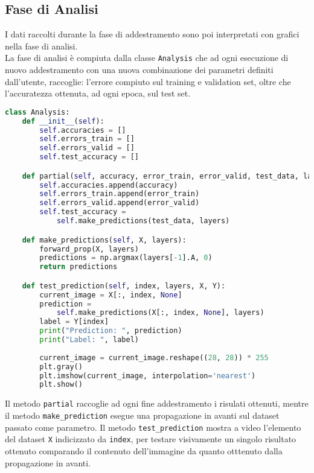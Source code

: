 \subsection{Fase di Analisi}
I dati raccolti durante la fase di addestramento sono poi interpretati con grafici nella fase di analisi. \\
La fase di analisi è compiuta dalla classe \texttt{Analysis} che ad ogni esecuzione di nuovo addestramento con una nuova combinazione dei parametri definiti dall'utente, raccoglie: l'errore compiuto sul training e validation set, oltre che l'accuratezza ottenuta, ad ogni epoca, sul test set. \\
\begin{lstlisting}[language=Python]
class Analysis:
    def __init__(self):
        self.accuracies = []
        self.errors_train = []
        self.errors_valid = []
        self.test_accuracy = []

    def partial(self, accuracy, error_train, error_valid, test_data, layers):
        self.accuracies.append(accuracy)
        self.errors_train.append(error_train)
        self.errors_valid.append(error_valid)
        self.test_accuracy = 
            self.make_predictions(test_data, layers)

    def make_predictions(self, X, layers):
        forward_prop(X, layers)
        predictions = np.argmax(layers[-1].A, 0)
        return predictions

    def test_prediction(self, index, layers, X, Y):
        current_image = X[:, index, None]
        prediction = 
            self.make_predictions(X[:, index, None], layers)
        label = Y[index]
        print("Prediction: ", prediction)
        print("Label: ", label)
        
        current_image = current_image.reshape((28, 28)) * 255
        plt.gray()
        plt.imshow(current_image, interpolation='nearest')
        plt.show()
\end{lstlisting}
Il metodo \texttt{partial} raccoglie ad ogni fine addestramento i risulati ottenuti, mentre il metodo \texttt{make\_prediction} esegue una propagazione in avanti sul dataset passato come parametro. Il metodo \texttt{test\_prediction} mostra a video l'elemento del dataset \texttt{X} indicizzato da \texttt{index}, per testare visivamente un singolo risultato ottenuto comparando il contenuto dell'immagine da quanto otttenuto dalla propagazione in avanti.\\

